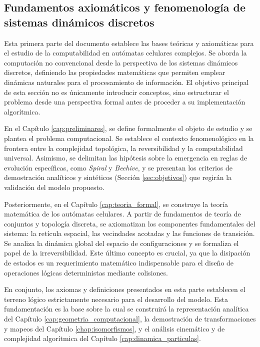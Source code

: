 % 
%
%

\begin{partbacktext}
\part{Fundamentos axiomáticos y fenomenología de sistemas dinámicos discretos}

\noindent Esta primera parte del documento establece las bases teóricas y axiomáticas para el estudio de la computabilidad en autómatas celulares complejos. Se aborda la computación no convencional desde la perspectiva de los sistemas dinámicos discretos, definiendo las propiedades matemáticas que permiten emplear dinámicas naturales para el procesamiento de información. El objetivo principal de esta sección no es únicamente introducir conceptos, sino estructurar el problema desde una perspectiva formal antes de proceder a su implementación algorítmica.

En el Capítulo \ref{cap:preliminares}, se define formalmente el objeto de estudio y se plantea el problema computacional. Se establece el contexto fenomenológico en la frontera entre la complejidad topológica, la reversibilidad y la computabilidad universal. Asimismo, se delimitan las hipótesis sobre la emergencia en reglas de evolución específicas, como \textit{Spiral} y \textit{Beehive}, y se presentan los criterios de demostración analíticos y sintéticos (Sección \ref{sec:objetivos}) que regirán la validación del modelo propuesto.

Posteriormente, en el Capítulo \ref{cap:teoria_formal}, se construye la teoría matemática de los autómatas celulares. A partir de fundamentos de teoría de conjuntos y topología discreta, se axiomatizan los componentes fundamentales del sistema: la retícula espacial, las vecindades acotadas y las funciones de transición. Se analiza la dinámica global del espacio de configuraciones y se formaliza el papel de la irreversibilidad. Este último concepto es crucial, ya que la disipación de estados es un requerimiento matemático indispensable para el diseño de operaciones lógicas deterministas mediante colisiones.

En conjunto, los axiomas y definiciones presentados en esta parte establecen el terreno lógico estrictamente necesario para el desarrollo del modelo. Esta fundamentación es la base sobre la cual se construirá la representación analítica del Capítulo \ref{cap:geometria_computacional}, la demostración de transformaciones y mapeos del Capítulo \ref{chap:isomorfismos}, y el análisis cinemático y de complejidad algorítmica del Capítulo \ref{cap:dinamica_particulas}.

\end{partbacktext}